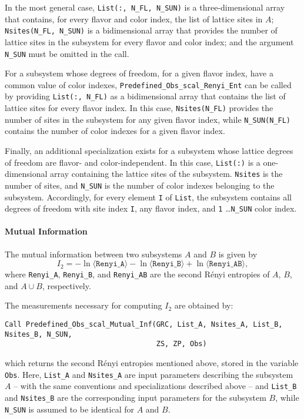 In the most general case, \texttt{List(:, N\_FL, N\_SUN)} is a three-dimensional array that contains, for every flavor and color index, the list of lattice sites in $A$; \texttt{Nsites(N\_FL, N\_SUN)} is a bidimensional array that provides the number of lattice sites in the subsystem for every flavor and color index; and the argument \texttt{N\_SUN} must be omitted in the call.

For a subsystem whose degrees of freedom, for a given flavor index, have a common value of color indexes, \texttt{Predefined\_Obs\_scal\_Renyi\_Ent} can be called by providing \texttt{List(:, N\_FL)} as a bidimensional array that contains the list of lattice sites for every flavor index. In this case, \texttt{Nsites(N\_FL)} provides the number of sites in the subsystem for any given flavor index, while \texttt{N\_SUN(N\_FL)} contains the number of color indexes for a given flavor index.

Finally, an additional specialization exists for a subsystem whose lattice degrees of freedom are flavor- and color-independent. In this case, \texttt{List(:)} is a one-dimensional array containing the lattice sites of the subsystem. \texttt{Nsites} is the number of sites, and \texttt{N\_SUN} is the number of color indexes belonging to the subsystem.
Accordingly, for every element \texttt{I} of \texttt{List}, the subsystem contains all degrees of freedom with site index \texttt{I}, any flavor index, and \texttt{1} \ldots \texttt{N\_SUN} color index.

\paragraph*{Mutual Information}
The mutual information between two subsystems $A$ and $B$ is given by
\begin{equation}
I_2=-\ln \langle \texttt{Renyi\_A}\rangle -\ln \langle \texttt{Renyi\_B}\rangle +\ln \langle \texttt{Renyi\_AB}\rangle,
\end{equation}
where \texttt{Renyi\_A}, \texttt{Renyi\_B}, and \texttt{Renyi\_AB} are the second R\'enyi entropies of $A$, $B$, and $A\cup B$, respectively.

The measurements necessary for computing $I_2$ are obtained by:
\begin{lstlisting}[style=fortran,breaklines=true]
Call Predefined_Obs_scal_Mutual_Inf(GRC, List_A, Nsites_A, List_B, Nsites_B, N_SUN, 
                                    ZS, ZP, Obs)
\end{lstlisting}
which returns the second R\'enyi entropies mentioned above, stored in the variable \texttt{Obs}. Here, \texttt{List\_A} and \texttt{Nsites\_A} are input parameters describing the subsystem $A$ -- with the same conventions and specializations described above -- and
\texttt{List\_B} and \texttt{Nsites\_B} are the corresponding input parameters for the subsystem $B$, while \texttt{N\_SUN} is assumed to be identical for $A$ and $B$.



